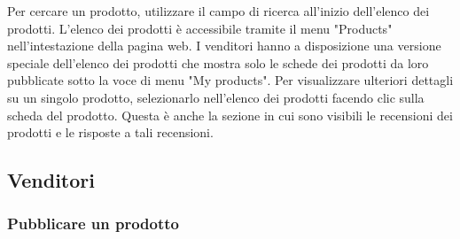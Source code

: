 \documentclass[conference,onecolumn,a4paper]{IEEEtran}
\begin{document}
Per cercare un prodotto, utilizzare il campo di ricerca all'inizio dell'elenco dei prodotti. L'elenco dei prodotti è accessibile tramite il menu "Products" nell'intestazione della pagina web. I venditori hanno a disposizione una versione speciale dell'elenco dei prodotti che mostra solo le schede dei prodotti da loro pubblicate sotto la voce di menu "My products". Per visualizzare ulteriori dettagli su un singolo prodotto, selezionarlo nell'elenco dei prodotti facendo clic sulla scheda del prodotto. Questa è anche la sezione in cui sono visibili le recensioni dei prodotti e le risposte a tali recensioni.

\subsection{Venditori}

\subsubsection{Pubblicare un prodotto}
\end{document}
